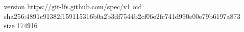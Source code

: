 version https://git-lfs.github.com/spec/v1
oid sha256:4891c91382f159115316b0a2b3df7544b2cf06e2fc741d990e00e79b6197a873
size 174916
